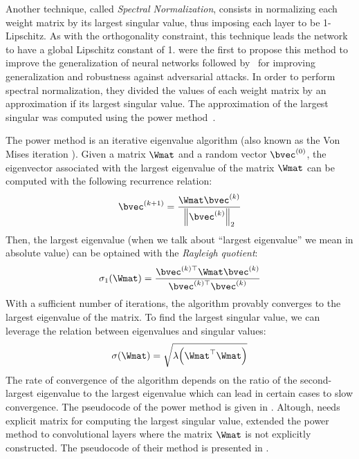 
Another technique, called \emph{Spectral Normalization}, consists in normalizing each weight matrix by its largest singular value, thus imposing each layer to be 1-Lipschitz.
As with the orthogonality constraint, this technique leads the network to have a global Lipschitz constant of 1.
\citet{yoshida2017spectral} were the first to propose this method to improve the generalization of neural networks followed by~\cite{miyato2018spectral,gouk2018regularisation,farnia2018generalizable} for improving generalization and robustness against adversarial attacks.
In order to perform spectral normalization, they divided the values of each weight matrix by an approximation if its largest singular value.
The approximation of the largest singular was computed using the power method~\cite{golub2000eigenvalue}.


The power method is an iterative eigenvalue algorithm (also known as the Von Mises iteration \cite{mises1929praktische}).
Given a matrix $\Wmat$ and a random vector $\bvec^{(0)}$, the eigenvector associated with the largest eigenvalue of the matrix $\Wmat$ can be computed with the following recurrence relation:
\begin{equation}
  \bvec^{(k+1)} = \frac{\Wmat \bvec^{(k)}}{\norm{\bvec^{(k)}}_2}  
\end{equation}
Then, the largest eigenvalue (when we talk about ``largest eigenvalue'' we mean in absolute value) can be optained with the \emph{Rayleigh quotient}:
\begin{equation}
  \sigma_1\left( \Wmat \right) = \frac{\bvec^{(k)\top} \Wmat \bvec^{(k)}}{\bvec^{(k)\top} \bvec^{(k)}}
\end{equation}
With a sufficient number of iterations, the algorithm provably converges to the largest eigenvalue of the matrix.
To find the largest singular value, we can leverage the relation between eigenvalues and singular values:
\begin{equation}
  \sigma \left( \Wmat \right) = \sqrt{ \lambda \left( \Wmat^\top \Wmat \right) }
\end{equation}
The rate of convergence of the algorithm depends on the ratio of the second-largest eigenvalue to the largest eigenvalue which can lead in certain cases to slow convergence.
The pseudocode of the power method is given in .
Altough,  needs explicit matrix for computing the largest singular value, \citet{farnia2018generalizable,ryu2019plug} extended the power method to convolutional layers where the matrix $\Wmat$ is not explicitly constructed.
The pseudocode of their method is presented in . 

